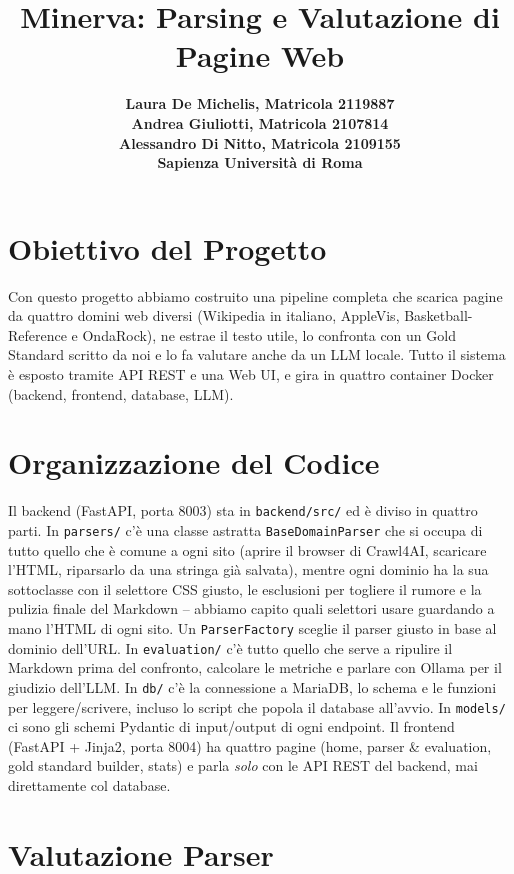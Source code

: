 \documentclass[11pt]{article}
\title{\textbf{Minerva: Parsing e Valutazione di Pagine Web}}
\author{
  \textbf{Laura De Michelis, Matricola 2119887} \\
  \textbf{Andrea Giuliotti, Matricola 2107814} \\
  \textbf{Alessandro Di Nitto, Matricola 2109155} \\
  \textbf{Sapienza Universit\`a di Roma}
}
\date{}
\begin{document}
\maketitle

\section{Obiettivo del Progetto}

Con questo progetto abbiamo costruito una pipeline completa che scarica
pagine da quattro domini web diversi (Wikipedia in italiano, AppleVis,
Basketball-Reference e OndaRock), ne estrae il testo utile, lo confronta con
un Gold Standard scritto da noi e lo fa valutare anche da un LLM locale. Tutto
il sistema è esposto tramite API REST e una Web UI, e gira in quattro
container Docker (backend, frontend, database, LLM).

\section{Organizzazione del Codice}

Il backend (FastAPI, porta 8003) sta in \texttt{backend/src/} ed è diviso in
quattro parti. In \texttt{parsers/} c'è una classe astratta
\texttt{BaseDomainParser} che si occupa di tutto quello che è comune a ogni
sito (aprire il browser di Crawl4AI, scaricare l'HTML, riparsarlo da una
stringa già salvata), mentre ogni dominio ha la sua sottoclasse con il
selettore CSS giusto, le esclusioni per togliere il rumore e la pulizia
finale del Markdown -- abbiamo capito quali selettori usare guardando a
mano l'HTML di ogni sito. Un \texttt{ParserFactory} sceglie il parser giusto
in base al dominio dell'URL. In \texttt{evaluation/} c'è tutto quello che
serve a ripulire il Markdown prima del confronto, calcolare le metriche e
parlare con Ollama per il giudizio dell'LLM. In \texttt{db/} c'è la
connessione a MariaDB, lo schema e le funzioni per leggere/scrivere, incluso
lo script che popola il database all'avvio. In \texttt{models/} ci sono gli
schemi Pydantic di input/output di ogni endpoint. Il frontend (FastAPI +
Jinja2, porta 8004) ha quattro pagine (home, parser \& evaluation, gold
standard builder, stats) e parla \emph{solo} con le API REST del backend,
mai direttamente col database.

\section{Valutazione Parser}
\end{document}

